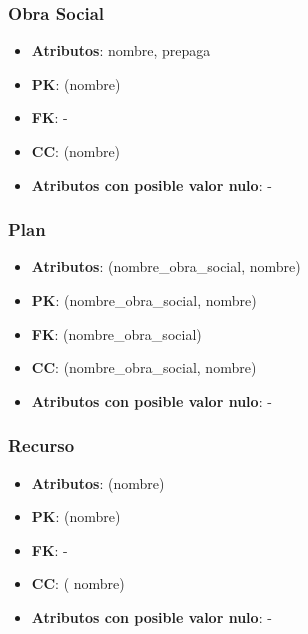 \documentclass[a4paper,11pt]{article}
\begin{document}
\subsubsection{\textbf{Obra Social}}

\begin{itemize}

\item 
\textbf{Atributos}: nombre, prepaga

\item 
\textbf{PK}: (nombre)

\item
\textbf{FK}: -

\item 
\textbf{CC}: (nombre)

\item 
\textbf{Atributos con posible valor nulo}: -

\end{itemize}

\subsubsection{\textbf{Plan}}

\begin{itemize}

\item 
\textbf{Atributos}: (nombre\_obra\_social, nombre)

\item 
\textbf{PK}: (nombre\_obra\_social, nombre)

\item
\textbf{FK}: (nombre\_obra\_social)

\item 
\textbf{CC}: (nombre\_obra\_social, nombre)

\item 
\textbf{Atributos con posible valor nulo}: -

\end{itemize}
\subsubsection{\textbf{Recurso}}

\begin{itemize}

\item 
\textbf{Atributos}: (nombre)

\item 
\textbf{PK}: (nombre)

\item
\textbf{FK}: -

\item 
\textbf{CC}: ( nombre)

\item 
\textbf{Atributos con posible valor nulo}: -

\end{itemize}
\end{document}
